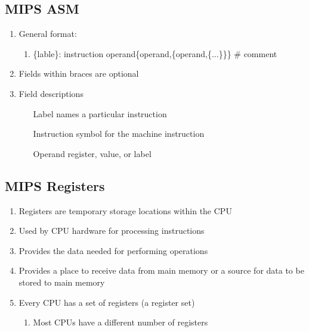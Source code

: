 \documentclass[12pt]{article}
\begin{document}
\subsection{MIPS ASM}
\begin{enumerate}
  \item General format:
  \begin{enumerate}
    \item \{lable\}: instruction operand\{operand,\{operand,\{...\}\}\} \# comment
  \end{enumerate}
  \item Fields within braces are optional
  \item Field descriptions
  \begin{enumerate}
    \item[Label] names a particular instruction
    \item[Instruction] symbol for the machine instruction
    \item[Operand] register, value, or label
  \end{enumerate}
\end{enumerate}



\subsection{MIPS Registers}
\begin{enumerate}
  \item Registers are temporary storage locations within the CPU
  \item Used by CPU hardware for processing instructions
  \item Provides the data needed for performing operations
  \item Provides a place to receive data from main memory or a source for data to be stored to main memory
  \item Every CPU has a set of registers (a register set)
  \begin{enumerate}
    \item Most CPUs have a different number of registers
  \end{enumerate}
\end{enumerate}
\end{document}

